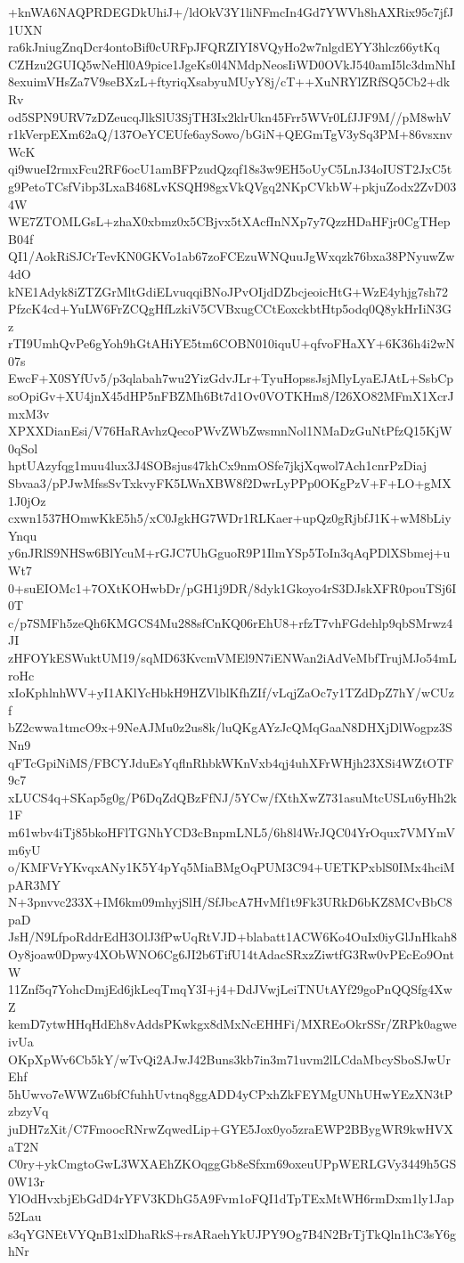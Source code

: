 +knWA6NAQPRDEGDkUhiJ+/ldOkV3Y1liNFmcIn4Gd7YWVh8hAXRix95c7jfJ1UXN
ra6kJniugZnqDcr4ontoBif0cURFpJFQRZIYI8VQyHo2w7nlgdEYY3hlcz66ytKq
CZHzu2GUIQ5wNeHl0A9pice1JgeKs0l4NMdpNeosIiWD0OVkJ540amI5lc3dmNhI
8exuimVHsZa7V9seBXzL+ftyriqXsabyuMUyY8j/cT++XuNRYlZRfSQ5Cb2+dkRv
od5SPN9URV7zDZeucqJlkSlU3SjTH3Ix2klrUkn45Frr5WVr0LfJJF9M//pM8whV
r1kVerpEXm62aQ/137OeYCEUfe6aySowo/bGiN+QEGmTgV3ySq3PM+86vsxnvWcK
qi9wueI2rmxFcu2RF6ocU1amBFPzudQzqf18s3w9EH5oUyC5LnJ34oIUST2JxC5t
g9PetoTCsfVibp3LxaB468LvKSQH98gxVkQVgq2NKpCVkbW+pkjuZodx2ZvD034W
WE7ZTOMLGsL+zhaX0xbmz0x5CBjvx5tXAcfInNXp7y7QzzHDaHFjr0CgTHepB04f
QI1/AokRiSJCrTevKN0GKVo1ab67zoFCEzuWNQuuJgWxqzk76bxa38PNyuwZw4dO
kNE1Adyk8iZTZGrMltGdiELvuqqiBNoJPvOIjdDZbcjeoicHtG+WzE4yhjg7sh72
PfzcK4cd+YuLW6FrZCQgHfLzkiV5CVBxugCCtEoxckbtHtp5odq0Q8ykHrIiN3Gz
rTI9UmhQvPe6gYoh9hGtAHiYE5tm6COBN010iquU+qfvoFHaXY+6K36h4i2wN07s
EwcF+X0SYfUv5/p3qlabah7wu2YizGdvJLr+TyuHopssJsjMlyLyaEJAtL+SsbCp
soOpiGv+XU4jnX45dHP5nFBZMh6Bt7d1Ov0VOTKHm8/I26XO82MFmX1XcrJmxM3v
XPXXDianEsi/V76HaRAvhzQecoPWvZWbZwsmnNol1NMaDzGuNtPfzQ15KjW0qSol
hptUAzyfqg1muu4lux3J4SOBsjus47khCx9nmOSfe7jkjXqwol7Ach1cnrPzDiaj
Sbvaa3/pPJwMfssSvTxkvyFK5LWnXBW8f2DwrLyPPp0OKgPzV+F+LO+gMX1J0jOz
cxwn1537HOmwKkE5h5/xC0JgkHG7WDr1RLKaer+upQz0gRjbfJ1K+wM8bLiyYnqu
y6nJRlS9NHSw6BlYcuM+rGJC7UhGguoR9P1IlmYSp5ToIn3qAqPDlXSbmej+uWt7
0+suEIOMc1+7OXtKOHwbDr/pGH1j9DR/8dyk1Gkoyo4rS3DJskXFR0pouTSj6I0T
c/p7SMFh5zeQh6KMGCS4Mu288sfCnKQ06rEhU8+rfzT7vhFGdehlp9qbSMrwz4JI
zHFOYkESWuktUM19/sqMD63KvcmVMEl9N7iENWan2iAdVeMbfTrujMJo54mLroHc
xIoKphlnhWV+yI1AKlYcHbkH9HZVlblKfhZIf/vLqjZaOc7y1TZdDpZ7hY/wCUzf
bZ2cwwa1tmcO9x+9NeAJMu0z2us8k/luQKgAYzJcQMqGaaN8DHXjDlWogpz3SNn9
qFTcGpiNiMS/FBCYJduEsYqflnRhbkWKnVxb4qj4uhXFrWHjh23XSi4WZtOTF9c7
xLUCS4q+SKap5g0g/P6DqZdQBzFfNJ/5YCw/fXthXwZ731asuMtcUSLu6yHh2k1F
m61wbv4iTj85bkoHFlTGNhYCD3cBnpmLNL5/6h8l4WrJQC04YrOqux7VMYmVm6yU
o/KMFVrYKvqxANy1K5Y4pYq5MiaBMgOqPUM3C94+UETKPxblS0IMx4hciMpAR3MY
N+3pnvvc233X+IM6km09mhyjSlH/SfJbcA7HvMf1t9Fk3URkD6bKZ8MCvBbC8paD
JsH/N9LfpoRddrEdH3OlJ3fPwUqRtVJD+blabatt1ACW6Ko4OuIx0iyGlJnHkah8
Oy8joaw0Dpwy4XObWNO6Cg6JI2b6TifU14tAdacSRxzZiwtfG3Rw0vPEcEo9OntW
11Znf5q7YohcDmjEd6jkLeqTmqY3I+j4+DdJVwjLeiTNUtAYf29goPnQQSfg4XwZ
kemD7ytwHHqHdEh8vAddsPKwkgx8dMxNcEHHFi/MXREoOkrSSr/ZRPk0agweivUa
OKpXpWv6Cb5kY/wTvQi2AJwJ42Buns3kb7in3m71uvm2lLCdaMbcySboSJwUrEhf
5hUwvo7eWWZu6bfCfuhhUvtnq8ggADD4yCPxhZkFEYMgUNhUHwYEzXN3tPzbzyVq
juDH7zXit/C7FmoocRNrwZqwedLip+GYE5Jox0yo5zraEWP2BBygWR9kwHVXaT2N
C0ry+ykCmgtoGwL3WXAEhZKOqggGb8eSfxm69oxeuUPpWERLGVy3449h5GS0W13r
YlOdHvxbjEbGdD4rYFV3KDhG5A9Fvm1oFQI1dTpTExMtWH6rmDxm1ly1Jap52Lau
s3qYGNEtVYQnB1xlDhaRkS+rsARaehYkUJPY9Og7B4N2BrTjTkQln1hC3sY6ghNr
